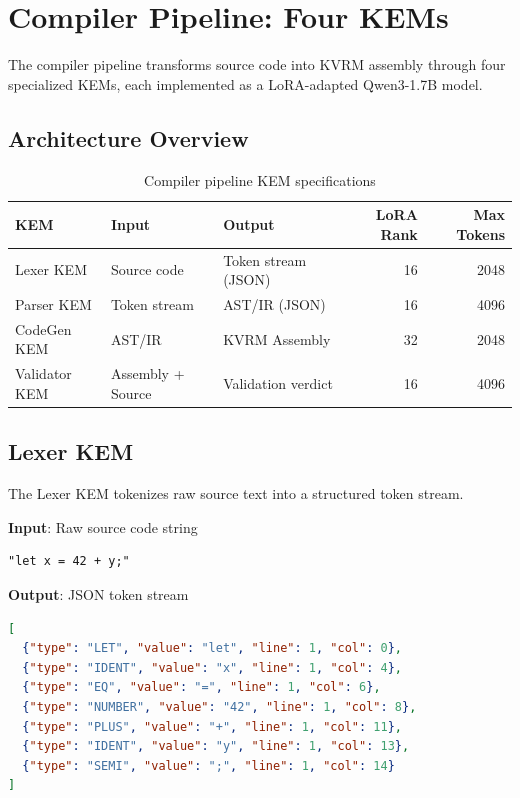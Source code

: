 \documentclass[11pt]{article}
\begin{document}
\section{Compiler Pipeline: Four KEMs}

The compiler pipeline transforms source code into KVRM assembly through four specialized KEMs, each implemented as a LoRA-adapted Qwen3-1.7B model.

\subsection{Architecture Overview}

\begin{table}[h]
\centering
\begin{tabular}{lllrr}
\toprule
\textbf{KEM} & \textbf{Input} & \textbf{Output} & \textbf{LoRA Rank} & \textbf{Max Tokens} \\
\midrule
Lexer KEM & Source code & Token stream (JSON) & 16 & 2048 \\
Parser KEM & Token stream & AST/IR (JSON) & 16 & 4096 \\
CodeGen KEM & AST/IR & KVRM Assembly & 32 & 2048 \\
Validator KEM & Assembly + Source & Validation verdict & 16 & 4096 \\
\bottomrule
\end{tabular}
\caption{Compiler pipeline KEM specifications}
\end{table}

\subsection{Lexer KEM}

The Lexer KEM tokenizes raw source text into a structured token stream.

\textbf{Input}: Raw source code string
\begin{lstlisting}
"let x = 42 + y;"
\end{lstlisting}

\textbf{Output}: JSON token stream
\begin{lstlisting}[language=json]
[
  {"type": "LET", "value": "let", "line": 1, "col": 0},
  {"type": "IDENT", "value": "x", "line": 1, "col": 4},
  {"type": "EQ", "value": "=", "line": 1, "col": 6},
  {"type": "NUMBER", "value": "42", "line": 1, "col": 8},
  {"type": "PLUS", "value": "+", "line": 1, "col": 11},
  {"type": "IDENT", "value": "y", "line": 1, "col": 13},
  {"type": "SEMI", "value": ";", "line": 1, "col": 14}
]
\end{lstlisting}
\end{document}
